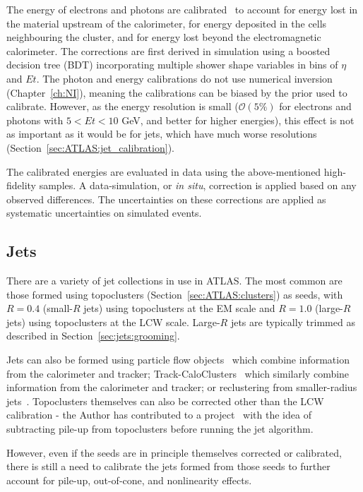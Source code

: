 The energy of electrons and photons are calibrated~\cite{Aaboud:2018ugz,PERF-2013-05} to account for energy lost in the material upstream of the calorimeter, for energy deposited in the cells neighbouring the cluster, and for energy lost beyond the electromagnetic calorimeter.
The corrections are first derived in simulation using a boosted decision tree (BDT) incorporating multiple shower shape variables in bins of $\eta$ and $Et$.
The photon and energy calibrations do not use numerical inversion (Chapter~\ref{ch:NI}), meaning the calibrations can be biased by the prior used to calibrate.
However, as the energy resolution is small ($\mathcal{O}(5\%)$ for electrons and photons with $5<Et<10$ GeV, and better for higher energies), this effect is not as important as it would be for jets, which have much worse resolutions (Section~\ref{sec:ATLAS:jet_calibration}).

The calibrated energies are evaluated in data using the above-mentioned high-fidelity samples.
A data-simulation, or \textit{in situ}, correction is applied based on any observed differences.
The uncertainties on these corrections are applied as systematic uncertainties on simulated events.

\subsection{Jets}
\label{sec:ATLAS:jets}
There are a variety of jet collections in use in ATLAS.
The most common are those formed using topoclusters (Section~\ref{sec:ATLAS:clusters}) as seeds, with $R=0.4$ (small-$R$ jets) using topoclusters at the EM scale and $R=1.0$ (large-$R$ jets) using topoclusters at the LCW scale.
Large-$R$ jets are typically trimmed as described in Section~\ref{sec:jets:grooming}.

Jets can also be formed using particle flow objects~\cite{Aaboud:2017aca} which combine information from the calorimeter and tracker; Track-CaloClusters~\cite{ATL-PHYS-PUB-2017-015} which similarly combine information from the calorimeter and tracker; or reclustering from smaller-radius jets~\cite{Nachman:2014kla}.
Topoclusters themselves can also be corrected other than the LCW calibration - the Author has contributed to a project~\cite{ATLAS-CONF-2017-065} with the idea of subtracting pile-up from topoclusters before running the jet algorithm.

However, even if the seeds are in principle themselves corrected or calibrated, there is still a need to calibrate the jets formed from those seeds to further account for pile-up, out-of-cone, and nonlinearity effects.

